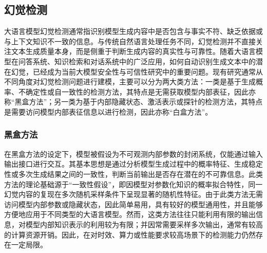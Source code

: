 \subsection{幻觉检测}\label{subsec:hallucination_detection}

大语言模型幻觉检测\cite{luo2024hallucination}通常指识别模型生成内容中是否包含与事实不符、缺乏依据或与上下文知识不一致的信息。与传统自然语言处理任务不同，幻觉检测并不直接关注文本生成质量本身，而是侧重于判断生成内容的真实性与可靠性。随着大语言模型在问答系统、知识检索和对话系统中的广泛应用，如何自动识别生成文本中的潜在幻觉，已经成为当前大模型安全性与可信性研究中的重要问题。现有研究通常从不同角度对幻觉检测问题进行建模，主要可以分为两大类方法：一类是基于生成概率、不确定性或自一致性的检测方法，其特点是无需获取模型内部表征，因此亦称“黑盒方法”；另一类为基于内部隐藏状态、激活表示或探针的检测方法，其特点是需要访问模型内部表征信息以进行检测，因此亦称“白盒方法”。

\subsubsection{黑盒方法}

在黑盒方法的设定下，模型被假设为不可观测内部参数的封闭系统，仅能通过输入输出接口进行交互。其基本思想是通过分析模型生成过程中的概率特征、生成稳定性或多次生成结果之间的一致性，判断当前输出是否存在潜在的不可靠信息。此类方法的理论基础源于“一致性假设”，即因模型对参数化知识的概率拟合特性，同一幻觉内容的复现在多次随机采样条件下呈现显著的随机性特征。由于此类方法无需访问模型内部参数或隐藏状态，因此简单易用，具有较好的模型通用性，并且能够方便地应用于不同类型的大语言模型。然而，这类方法往往只能利用有限的输出信息，对模型内部知识表示的利用较为有限；并因常需要采样多次输出，通常有较高的计算资源开销。因此，在对时效、算力或性能要求较高场景下的检测能力仍然存在一定局限。

